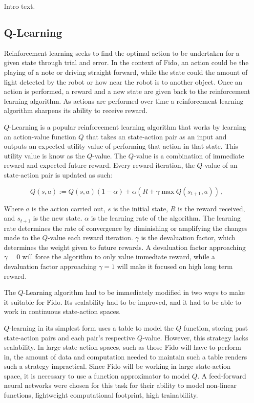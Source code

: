 Intro text.

\subsection{Q-Learning}

Reinforcement learning seeks to find the optimal action to be undertaken for a given state through trial and error. In the context of Fido, an action could be the playing of a note or driving straight forward, while the state could the amount of light detected by the robot or how near the robot is to another object. Once an action is performed, a reward and a new state are given back to the reinforcement learning algorithm.  As actions are performed over time a reinforcement learning algorithm sharpens its ability to receive reward.

$Q$-Learning \cite{watkins} is a popular reinforcement learning algorithm that works by learning an action-value function $Q$ that takes an state-action pair as an input and outputs an expected utility value of performing that action in that state. This utility value is know as the $Q$-value. The $Q$-value is a combination of immediate reward and expected future reward. Every reward iteration, the $Q$-value of an state-action pair is updated as such:

\begin{equation}
	Q(s, a) := Q(s, a)(1 - \alpha) + \alpha(R + \gamma \max Q(s_{t+1}, a))
	\,,
	\label{equ::updateqlearn}
\end{equation}

Where $a$ is the action carried out, $s$ is the initial state, $R$ is the reward received, and $s_{t+1}$ is the new state. $\alpha$ is the learning rate of the algorithm. The learning rate determines the rate of convergence by diminishing or amplifying the changes made to the $Q$-value each reward iteration. $\gamma$ is the devaluation factor, which determines the weight given to future rewards. A devaluation factor approaching $\gamma=0$ will force the algorithm to only value immediate reward, while a devaluation factor approaching $\gamma=1$ will make it focused on high long term reward.

The $Q$-Learning algorithm had to be immediately modified in two ways to make it suitable for Fido. Its scalability had to be improved, and it had to be able to work in continuous state-action spaces. 

$Q$-learning in its simplest form uses a table to model the $Q$ function, storing past state-action pairs and each pair's respective $Q$-value.  However, this strategy lacks scalability. In large state-action spaces, such as those Fido will have to perform in, the amount of data and computation needed to maintain such a table renders such a strategy impractical. Since Fido will be working in large state-action space, it is necessary to use a function approximator to model $Q$. A feed-forward neural networks were chosen for this task for their ability to model non-linear functions, lightweight computational footprint, high trainablility.

